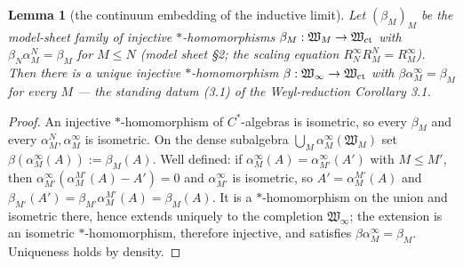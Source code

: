 \documentclass[11pt,a4paper]{article}
\theoremstyle{plain}
\newtheorem{lemma}[theorem]{Lemma}
\theoremstyle{definition}
\newcommand{\W}{\mathfrak W}
\begin{document}
\begin{lemma}[the continuum embedding of the inductive limit]
\label{lem:beta}
Let $(\beta_M)_M$ be the model-sheet family of injective $*$-homomorphisms
$\beta_M:\W_M\to\W_{\rm ct}$ with $\beta_N\alpha_M^N=\beta_M$ for $M\le N$
(model sheet \S2; the scaling equation $R^\infty_NR^N_M=R^\infty_M$). Then
there is a unique injective $*$-homomorphism $\beta:\W_\infty\to\W_{\rm ct}$
with $\beta\alpha_M^\infty=\beta_M$ for every $M$ --- the standing datum
(3.1) of the Weyl-reduction Corollary 3.1.
\end{lemma}

\begin{proof}
An injective $*$-homomorphism of $C^*$-algebras is isometric, so every
$\beta_M$ and every $\alpha_M^N,\alpha_M^\infty$ is isometric. On the dense
subalgebra $\bigcup_M\alpha_M^\infty(\W_M)$ set
$\beta(\alpha_M^\infty(A)):=\beta_M(A)$. Well defined: if
$\alpha_M^\infty(A)=\alpha_{M'}^\infty(A')$ with $M\le M'$, then
$\alpha_{M'}^\infty(\alpha_M^{M'}(A)-A')=0$ and $\alpha_{M'}^\infty$ is
isometric, so $A'=\alpha_M^{M'}(A)$ and
$\beta_{M'}(A')=\beta_{M'}\alpha_M^{M'}(A)=\beta_M(A)$. It is a
$*$-homomorphism on the union and isometric there, hence extends uniquely to
the completion $\W_\infty$; the extension is an isometric $*$-homomorphism,
therefore injective, and satisfies $\beta\alpha_M^\infty=\beta_M$.
Uniqueness holds by density.
\end{proof}
\end{document}
